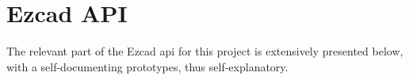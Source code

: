 %
%
\chapter{Ezcad API}%
\label{ch:append-EzcadAPI}
The relevant part of the Ezcad \gls{api} for this project is extensively
presented below, with a self-documenting prototypes, thus self-explanatory. 

%


